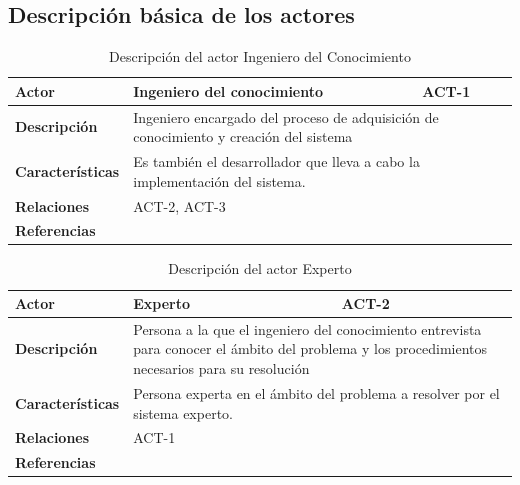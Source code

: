 \subsection{Descripción básica de los actores}

\begin{table}[H]
	\begin{tabular}{@{}|l|p{9cm}|p{2cm}|@{}}
		\hline
		\textbf{Actor}  & Ingeniero del conocimiento & \cellcolor{gray}ACT-1  \\ \hline
		\textbf{Descripción} & \multicolumn{2}{p{11cm}|}{Ingeniero encargado del proceso de adquisición de conocimiento y creación del sistema} \\ \hline
		\textbf{Características} & \multicolumn{2}{p{11cm}|}{Es también el desarrollador que lleva a cabo la implementación del sistema.} \\ \hline
		\textbf{Relaciones} & \multicolumn{2}{p{11cm}|}{ACT-2, ACT-3} \\ \hline
		\textbf{Referencias} & \multicolumn{2}{p{11cm}|}{} \\ \hline
	\end{tabular}
	\caption{Descripción del actor Ingeniero del Conocimiento}
	\label{tablaACT1}
\end{table}

\begin{table}[H]
	\begin{tabular}{@{}|l|p{9cm}|p{2cm}|@{}}
		\hline
		\textbf{Actor} & Experto & \cellcolor{gray}ACT-2 \\ \hline
		\textbf{Descripción} & \multicolumn{2}{p{11cm}|}{Persona a la que el ingeniero del conocimiento entrevista para conocer el ámbito del problema y los procedimientos necesarios para su resolución} \\ \hline
		\textbf{Características} & \multicolumn{2}{p{11cm}|}{Persona experta en el ámbito del problema a resolver por el sistema experto.} \\ \hline
		\textbf{Relaciones} & \multicolumn{2}{p{11cm}|}{ACT-1} \\ \hline
		\textbf{Referencias} & \multicolumn{2}{p{11cm}|}{} \\ \hline
	\end{tabular}
	\caption{Descripción del actor Experto}
	\label{tablaACT2}
\end{table}


